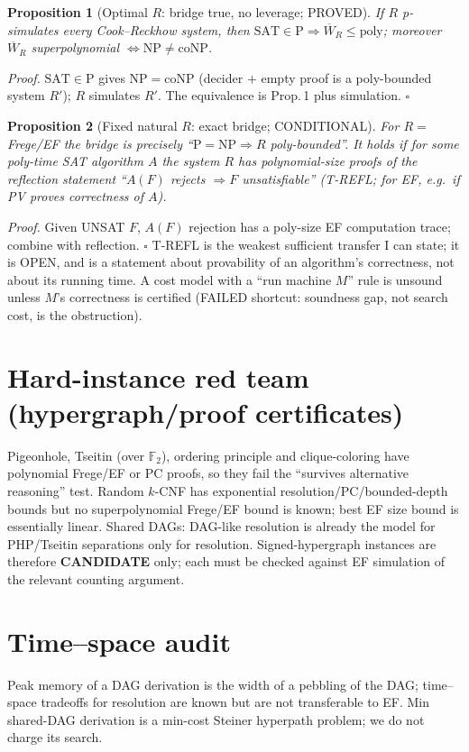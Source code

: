\documentclass{article}
\newtheorem{prop}{Proposition}
\begin{document}
\begin{prop}[Optimal $R$: bridge true, no leverage; PROVED]
If $R$ p-simulates every Cook--Reckhow system, then $\mathrm{SAT}\in\mathrm P\Rightarrow \overline W_R\le\mathrm{poly}$; moreover $\overline W_R$ superpolynomial $\iff \mathrm{NP}\ne\mathrm{coNP}$.
\end{prop}
\emph{Proof.} $\mathrm{SAT}\in\mathrm P$ gives $\mathrm{NP}=\mathrm{coNP}$ (decider $+$ empty proof is a poly-bounded system $R'$); $R$ simulates $R'$. The equivalence is Prop.\,1 plus simulation. $\square$

\begin{prop}[Fixed natural $R$: exact bridge; CONDITIONAL]
For $R=$ Frege/EF the bridge is precisely ``$\mathrm P=\mathrm{NP}\Rightarrow R$ poly-bounded''. It holds if for some poly-time SAT algorithm $A$ the system $R$ has polynomial-size proofs of the reflection statement ``$A(F)$ rejects $\Rightarrow F$ unsatisfiable'' (T-REFL; for EF, e.g.\ if PV proves correctness of $A$).
\end{prop}
\emph{Proof.} Given UNSAT $F$, $A(F)$ rejection has a poly-size EF computation trace; combine with reflection. $\square$
T-REFL is the weakest sufficient transfer I can state; it is OPEN, and is a statement about provability of an algorithm's correctness, not about its running time. A cost model with a ``run machine $M$'' rule is unsound unless $M$'s correctness is certified (FAILED shortcut: soundness gap, not search cost, is the obstruction).

\section*{Hard-instance red team (hypergraph/proof certificates)}
Pigeonhole, Tseitin (over $\mathbb F_2$), ordering principle and clique-coloring have polynomial Frege/EF or PC proofs, so they fail the ``survives alternative reasoning'' test. Random $k$-CNF has exponential resolution/PC/bounded-depth bounds but no superpolynomial Frege/EF bound is known; best EF size bound is essentially linear. Shared DAGs: DAG-like resolution is already the model for PHP/Tseitin separations only for resolution. Signed-hypergraph instances are therefore \textbf{CANDIDATE} only; each must be checked against EF simulation of the relevant counting argument.

\section*{Time--space audit}
Peak memory of a DAG derivation is the width of a pebbling of the DAG; time--space tradeoffs for resolution are known but are not transferable to EF. Min shared-DAG derivation is a min-cost Steiner hyperpath problem; we do not charge its search.
\end{document}
